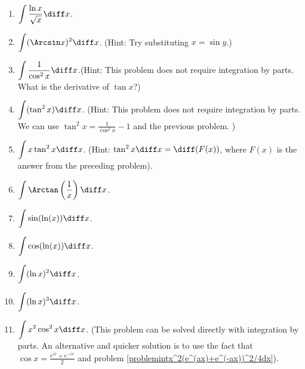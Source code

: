 \begin{multicols}{2}
\begin{enumerate}[ref={\fcProblemRef}]
\item \label{problemintlnx/sqrt(x)dx} $\displaystyle\int \frac{\ln x}{\sqrt{x}}\diff x $.

\item \label{problemIntegrateArcsinSquared} $\displaystyle\int (\Arcsin x)^2 \diff x $. \quad \quad (Hint: Try substituting $x=\sin y$.)


\item $\displaystyle\int \frac{1}{\cos^2 x}\diff x$.\quad \quad (Hint: This problem does not require integration by parts. What is the derivative of $\tan x$?)

\item $\displaystyle\int (\tan^2 x) \diff x $. \quad \quad (Hint: This problem does not require integration by parts. We can use $\tan^2 x = \frac{1}{\cos^2x }-1$ and the previous problem. )


\item \label{problemintxtan^2xdx} $\displaystyle\int x \tan^2 x \diff x $. \quad \quad (Hint: $\tan^2 x \diff x= \diff (F(x))$, where $F(x)$ is the answer from the preceding problem).

\item 
$\displaystyle
\int\Arctan \left(\frac{1}x\right)\diff x
$.

\item \label{problemintsin(ln x)dx}

$\displaystyle\int \sin (\ln (x)) \diff x $.


\item 
$\displaystyle\int \cos (\ln (x)) \diff x $.


\item $\displaystyle\int (\ln x)^2 \diff x$.
\item $\displaystyle\int (\ln x)^3 \diff x$.
\item $\displaystyle\int x^2\cos^2x \diff x$. (This problem can be solved directly with integration by parts. An alternative and quicker solution is to use the fact that $\cos x= \frac{ e^{ix} + e^{-ix}}{2}$ and problem \ref{problemintx^2(e^(ax)+e^(-ax))^2/4dx}).
\end{enumerate}
\end{multicols}

